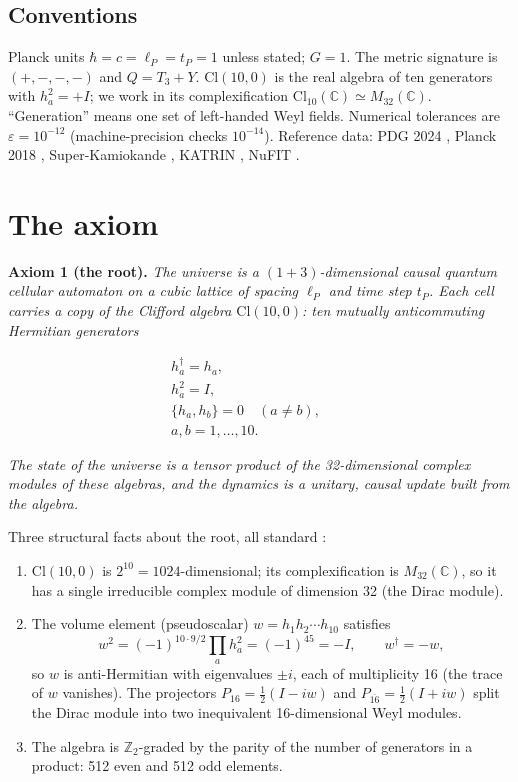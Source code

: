 \documentclass[aps,prd,twocolumn,amsmath,amssymb,superscriptaddress,nofootinbib,floatfix]{revtex4-2}
\providecommand{\tightlist}{\setlength{\itemsep}{0pt}\setlength{\parskip}{0pt}}
\begin{document}
\subsection{Conventions}\label{conventions}

Planck units \(\hbar = c = \ell_P = t_P = 1\) unless stated; \(G = 1\).
The metric signature is \((+,-,-,-)\) and \(Q = T_3 + Y\).
\(\mathrm{Cl}(10,0)\) is the real algebra of ten generators with
\(h_a^2 = +I\); we work in its complexification
\(\mathrm{Cl}_{10}(\mathbb{C}) \simeq M_{32}(\mathbb{C})\).
``Generation'' means one set of left-handed Weyl fields. Numerical
tolerances are \(\varepsilon = 10^{-12}\) (machine-precision checks
\(10^{-14}\)). Reference data: PDG 2024 \cite{ref13}, Planck 2018
\cite{ref14}, Super-Kamiokande \cite{ref15}, KATRIN \cite{ref16}, NuFIT
\cite{ref17}.

\section{The axiom}\label{the-axiom}

\textbf{Axiom 1 (the root).} \emph{The universe is a
\((1{+}3)\)-dimensional causal quantum cellular automaton on a cubic
lattice of spacing \(\ell_P\) and time step \(t_P\). Each cell carries a
copy of the Clifford algebra \(\mathrm{Cl}(10,0)\): ten mutually
anticommuting Hermitian generators}

\begin{multline}
    h_a^\dagger = h_a,\qquad \\
    h_a^2 = I,\qquad \\
    \{h_a,h_b\} = 0 \quad (a\ne b),\qquad \\
    a,b = 1,\dots,10.
\end{multline}

\emph{The state of the universe is a tensor product of the
32-dimensional complex modules of these algebras, and the dynamics is a
unitary, causal update built from the algebra.}

Three structural facts about the root, all standard \cite{ref10,ref18}:

\begin{enumerate}
\def\labelenumi{\arabic{enumi}.}
\tightlist
\item
  \(\mathrm{Cl}(10,0)\) is \(2^{10} = 1024\)-dimensional; its
  complexification is \(M_{32}(\mathbb{C})\), so it has a single
  irreducible complex module of dimension 32 (the Dirac module).
\item
  The volume element (pseudoscalar) \(w = h_1 h_2 \cdots h_{10}\)
  satisfies
  \[w^2 = (-1)^{10\cdot 9/2}\prod_a h_a^2 = (-1)^{45} = -I,\qquad w^\dagger = -w,\]
  so \(w\) is anti-Hermitian with eigenvalues \(\pm i\), each of
  multiplicity 16 (the trace of \(w\) vanishes). The projectors
  \(P_{16} = \tfrac12(I - i w)\) and
  \(P_{\overline{16}} = \tfrac12(I + i w)\) split the Dirac module into
  two inequivalent 16-dimensional Weyl modules.
\item
  The algebra is \(\mathbb{Z}_2\)-graded by the parity of the number of
  generators in a product: 512 even and 512 odd elements.
\end{enumerate}
\end{document}
